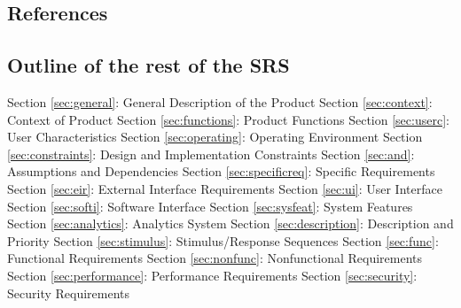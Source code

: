 \documentclass[a4paper, 12pt]{article}
\begin{document}
\subsection{References} \label{sec:ref}
\begin{adjustwidth}{2em}{0pt}

\end{adjustwidth}

\subsection{Outline of the rest of the SRS} \label{sec:outline}
\begin{adjustwidth}{2em}{0pt}
Section \ref{sec:general}: General Description of the Product \newline
Section \ref{sec:context}: Context of Product \newline
Section \ref{sec:functions}: Product Functions \newline
Section \ref{sec:userc}: User Characteristics \newline
Section \ref{sec:operating}: Operating Environment \newline
Section \ref{sec:constraints}: Design and Implementation Constraints \newline
Section \ref{sec:and}: Assumptions and Dependencies \newline
Section \ref{sec:specificreq}: Specific Requirements \newline
Section \ref{sec:eir}: External Interface Requirements \newline
Section \ref{sec:ui}: User Interface \newline
Section \ref{sec:softi}: Software Interface \newline
Section \ref{sec:sysfeat}: System Features \newline
Section \ref{sec:analytics}: Analytics System \newline
Section \ref{sec:description}: Description and Priority \newline
Section \ref{sec:stimulus}: Stimulus/Response Sequences \newline
Section \ref{sec:func}: Functional Requirements \newline
Section \ref{sec:nonfunc}: Nonfunctional Requirements \newline
Section \ref{sec:performance}: Performance Requirements \newline
Section \ref{sec:security}: Security Requirements \newline

\end{adjustwidth}
\end{document}
